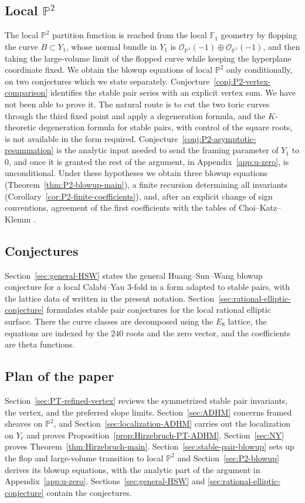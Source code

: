 \documentclass{amsart}
\theoremstyle{definition}
\numberwithin{equation}{section}
\newcommand{\cO}{\mathcal O}
\begin{document}
\subsection{Local \texorpdfstring{\(\mathbb P^2\)}{P2}}
The local \(\mathbb P^2\) partition function is reached from the local \(\mathbb F_1\) geometry by flopping the curve \(B\subset Y_1\), whose normal bundle in \(Y_1\) is \(\cO_{\mathbb P^1}(-1)\oplus\cO_{\mathbb P^1}(-1)\), and then taking the large-volume limit of the flopped curve while keeping the hyperplane coordinate fixed.  We obtain the blowup equations of local \(\mathbb P^2\) only conditionally, on two conjectures which we state separately.  Conjecture~\ref{conj:P2-vertex-comparison} identifies the stable pair series with an explicit vertex sum.  We have not been able to prove it.  The natural route is to cut the two toric curves through the third fixed point and apply a degeneration formula, and the \(K\)-theoretic degeneration formula for stable pairs, with control of the square roots, is not available in the form required.  Conjecture~\ref{conj:P2-asymptotic-resummation} is the analytic input needed to send the framing parameter of \(Y_1\) to \(0\), and once it is granted the rest of the argument, in Appendix~\ref{app:u-zero}, is unconditional.  Under these hypotheses we obtain three blowup equations (Theorem~\ref{thm:P2-blowup-main}), a finite recursion determining all invariants (Corollary~\ref{cor:P2-finite-coefficients}), and, after an explicit change of sign conventions, agreement of the first coefficients with the tables of Choi--Katz--Klemm \cite{ChoiKatzKlemm}.

\subsection{Conjectures}
Section~\ref{sec:general-HSW} states the general Huang--Sun--Wang blowup conjecture for a local Calabi--Yau 3-fold in a form adapted to stable pairs, with the lattice data of \cite{HuangSunWang} written in the present notation.  Section~\ref{sec:rational-elliptic-conjecture} formulates stable pair conjectures for the local rational elliptic surface.  There the curve classes are decomposed using the \(E_8\) lattice, the equations are indexed by the \(240\) roots and the zero vector, and the coefficients are theta functions.

\subsection{Plan of the paper}
Section~\ref{sec:PT-refined-vertex} reviews the symmetrized stable pair invariants, the vertex, and the preferred slope limits.  Section~\ref{sec:ADHM} concerns framed sheaves on \(\mathbb P^2\), and Section~\ref{sec:localization-ADHM} carries out the localization on \(Y_\ell\) and proves Proposition~\ref{prop:Hirzebruch-PT-ADHM}.  Section~\ref{sec:NY} proves Theorem~\ref{thm:Hirzebruch-main}.  Section~\ref{sec:stable-pair-blowup} sets up the flop and large-volume transition to local \(\mathbb P^2\) and Section~\ref{sec:P2-blowup} derives its blowup equations, with the analytic part of the argument in Appendix~\ref{app:u-zero}.  Sections~\ref{sec:general-HSW} and \ref{sec:rational-elliptic-conjecture} contain the conjectures.
\end{document}
